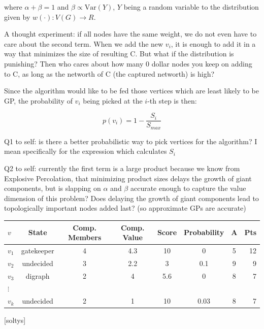 \documentclass[a4paper]{article}
\renewcommand{\cite}[1]{[#1]}
\newcommand{\Var}{\mathrm{Var}}
\begin{document}
where $\alpha + \beta = 1$ and $\beta \propto \Var(Y)$, $Y$ being a random variable to the distribution given by $w(\cdot): V(G) \rightarrow R$. 

A thought experiment: if all nodes have the same weight, we do not even have to care about the second term. When we add the new $v_i$, it is enough to add it in a way that minimizes the size of resulting C. But what if the distribution is punishing? Then who cares about how many $0$ dollar nodes you keep on adding to C, as long as the networth of C (the captured networth) is high?

Since the algorithm would like to be fed those vertices which are least likely to be GP, the probability of $v_i$ being picked at the $i$-th step is then: 

\[ p(v_i) = 1- \frac{S_i}{S_{max}} \]


Q1 to self: is there a better probabilistic way to pick vertices for the algorithm? I mean specifically for the expression which calculates $S_i$

Q2 to self: currently the first term is a large product because we know from Explosive Percolation, that minimizing product sizes delays the growth of giant components, but is slapping on $\alpha$ and $\beta$ accurate enough to capture the value dimension of this problem? Does delaying the growth of giant components lead to topologically important nodes added last? (so approximate GPs are accurate) 


\vspace{1cm}
\begin{tabular}{l*{6}{c}r}
$v$             & State & Comp. Members & Comp. Value & Score & Probability  & A & Pts \\
\hline
$v_1$ & gatekeeper & 4 & 4.3 & 10 & 0 & 5 & 12  \\
$v_2$            & undecided & 3 & 2.2 & 3 &  0.1 & 9 &  9  \\
$v_3$           & digraph & 2 & 4 & 5.6 &  0 & 8 &  7  \\
$\vdots$     &  &  &  &  &   &  &    \\
$v_k$     & undecided & 2 & 1 & 10 &  0.03 & 8 &  7  \\
\end{tabular}




\cite{soltys}
  
%

\end{document}
